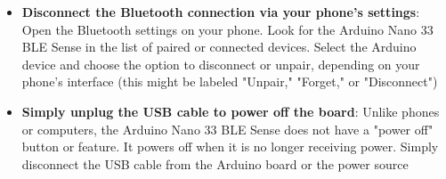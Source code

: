 \begin{itemize}
    \item \textbf{Disconnect the Bluetooth connection via your phone's settings}:
    Open the
    Bluetooth settings on your phone. Look for the Arduino Nano 33 BLE Sense in
    the list of paired or connected devices. Select the Arduino device and choose
    the option to disconnect or unpair, depending on your phone’s interface (this
    might be labeled "Unpair," "Forget," or "Disconnect")
    \item \textbf{Simply unplug the USB cable to power off the board}:
    Unlike phones or computers,
    the Arduino Nano 33 BLE Sense does not have a "power off" button or feature.
    It powers off when it is no longer receiving power. Simply disconnect the USB
    cable from the Arduino board or the power source
\end{itemize}
